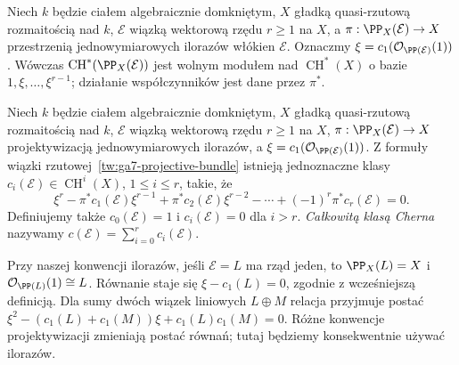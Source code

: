 \begin{twierdzenie}
\label{tw:ga7-projective-bundle}
Niech $k$ będzie ciałem algebraicznie domkniętym,
$X$ gładką quasi-rzutową rozmaitością nad $k$,
$\mathcal E$ wiązką wektorową rzędu $r\ge1$ na $X$, a
$\pi:\PP_X(\mathcal E)\to X$ przestrzenią
jednowymiarowych ilorazów włókien $\mathcal E$.
Oznaczmy $\xi=c_1(\mathcal O_{\PP(\mathcal E)}(1))$.
Wówczas $\operatorname{CH}^*(\PP_X(\mathcal E))$ jest
wolnym modułem nad $\operatorname{CH}^*(X)$ o bazie
$1,\xi,\ldots,\xi^{r-1}$; działanie współczynników
jest dane przez $\pi^*$.
\end{twierdzenie}

\begin{definicja}
\label{def:ga7-c-classes}
Niech $k$ będzie ciałem algebraicznie domkniętym,
$X$ gładką quasi-rzutową rozmaitością nad $k$,
$\mathcal E$ wiązką wektorową rzędu $r\ge1$ na $X$,
$\pi:\PP_X(\mathcal E)\to X$ projektywizacją
jednowymiarowych ilorazów, a
$\xi=c_1(\mathcal O_{\PP(\mathcal E)}(1))$.
Z formuły wiązki rzutowej~\ref{tw:ga7-projective-bundle}
istnieją jednoznaczne klasy
$c_i(\mathcal E)\in\operatorname{CH}^i(X)$, $1\le i\le r$,
takie, że
\[
\xi^r-\pi^*c_1(\mathcal E)\xi^{r-1}
+\pi^*c_2(\mathcal E)\xi^{r-2}
-\cdots+(-1)^r\pi^*c_r(\mathcal E)=0.
\]
Definiujemy także $c_0(\mathcal E)=1$ i
$c_i(\mathcal E)=0$ dla $i>r$.
\emph{Całkowitą klasą Cherna} nazywamy
$c(\mathcal E)=\sum_{i=0}^r c_i(\mathcal E)$.
\end{definicja}

\begin{uwaga}
Przy naszej konwencji ilorazów, jeśli $\mathcal E=L$
ma rząd jeden, to $\PP_X(L)=X$ i
$\mathcal O_{\PP(L)}(1)\cong L$. Równanie staje się
$\xi-c_1(L)=0$, zgodnie z wcześniejszą definicją.
Dla sumy dwóch wiązek liniowych $L\oplus M$ relacja
przyjmuje postać
$\xi^2-(c_1(L)+c_1(M))\xi+c_1(L)c_1(M)=0$.
Różne konwencje projektywizacji zmieniają postać
równań; tutaj będziemy konsekwentnie używać ilorazów.
\end{uwaga}

